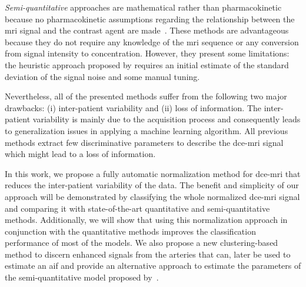 \emph{Semi-quantitative} approaches are mathematical rather than pharmacokinetic because no pharmacokinetic assumptions regarding the relationship between the \ac{mri} signal and the contrast agent are made~\citep{huisman2001accurate,gliozzi2011phenomenological}.
These methods are advantageous because they do not require any knowledge of the \ac{mri} sequence or any conversion from signal intensity to concentration.
However, they present some limitations: the heuristic approach
proposed by \citeauthor{huisman2001accurate} requires an initial
estimate of the standard deviation of the signal noise and some manual tuning.

Nevertheless, all of the presented methods suffer from the following two major drawbacks:
(i) inter-patient variability and (ii) loss of information.
The inter-patient variability is mainly due to the acquisition process
and consequently leads to generalization issues in applying a machine learning algorithm.
All previous methods extract few discriminative parameters to describe the \ac{dce}-\ac{mri} signal which might lead to a loss of information.

In this work, we propose a fully automatic normalization method for \ac{dce}-\ac{mri} that reduces the inter-patient variability of the data.
The benefit and simplicity of our approach will be demonstrated by
classifying the whole normalized \ac{dce}-\ac{mri} signal and
comparing it with state-of-the-art quantitative and semi-quantitative methods.
Additionally, we will show that using this normalization approach in conjunction with the quantitative methods improves the classification performance of most of the models.
We also propose a new clustering-based method to discern enhanced
signals from the arteries that can, later be used to estimate an
\ac{aif} and provide an alternative approach to estimate the parameters of the semi-quantitative model proposed by~\cite{huisman2001accurate}.


